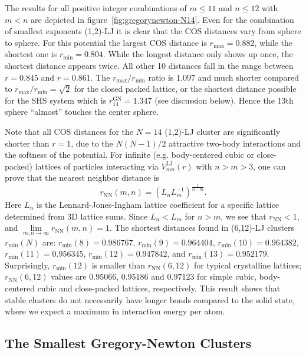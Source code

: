 The results for all positive integer combinations of $m\leq11$ and $n\leq12$
with $m<n$ are depicted in figure~\ref{fig:gregorynewton-N14}. Even for the
combination of smallest exponents (1,2)-\ac{LJ} it is clear that the \ac{COS}
distances vary from sphere to sphere. For this potential the largest \ac{COS}
distance is $r_\text{max}=0.882$, while the shortest one is
$r_\text{min}=0.804$. While the longest distance only shows up once, the
shortest distance appears twice. All other 10 distances fall in the range
between $r = 0.845$ and $r = 0.861$. The $r_\text{max} /r_\text{min}$ ratio is
$1.097$ and much shorter compared to $r_\text{max} /r_\text{min}= \sqrt{2}$ for
the closed packed lattice, or the shortest distance possible for the \ac{SHS}
system which is $r_{14}^\text{GN} = 1.347$ (see discussion below). Hence the
13th sphere ``almost'' touches the center sphere.

Note that all \ac{COS} distances for the $N=14$ (1,2)-\ac{LJ} cluster are
significantly shorter than $r=1$, due to the $N(N-1)/2$ attractive two-body
interactions and the softness of the potential.  For infinite (e.g.
body-centered cubic or close-packed) lattices of particles interacting via
$V^\mathrm{LJ}_{mn}(r)$ with $n> m >3$, one can prove
\autocite{Schwerdtfeger_ExtensionLennardJonespotential_2006} that the nearest neighbor distance is
%
\begin{equation}
    r_\mathrm{NN}(m,n)=\left( L_n L_m^{-1}\right)^\frac{1}{n-m}. %
    \label{eqn:lattice}
\end{equation}%
%
Here $L_n$ is the Lennard-Jones-Ingham lattice coefficient for a specific
lattice determined from 3D lattice sums.  Since $L_n<L_m$ for $n>m$, we see
that $r_\mathrm{NN}<1$, and $\lim\limits_{m,n\rightarrow
\infty}r_\mathrm{NN}(m,n)=1$.  The shortest distances found in (6,12)-\ac{LJ}
clusters $r_\text{min}(N)$ are: $r_\text{min}(8)=0.986767$,
$r_\text{min}(9)=0.964404$, $r_\text{min}(10)=0.964382$,
$r_\text{min}(11)=0.956345$, $r_\text{min}(12)=0.947842$, and
$r_\text{min}(13)=0.952179$.  Surprisingly, $r_\text{min}(12)$ is smaller than
$r_\mathrm{NN}(6,12)$ for typical crystalline lattices; $r_\mathrm{NN}(6,12)$
values are $0.95066$, $0.95186$ and $0.97123$ for simple cubic, body-centered
cubic and close-packed lattices, respectively.  This result shows that stable
clusters do not necessarily have longer bonds compared to the solid state,
where we expect a maximum in interaction energy per atom.


\subsection{The Smallest Gregory-Newton Clusters}
\label{sec:themsmallestgregorynewtonclusters}

